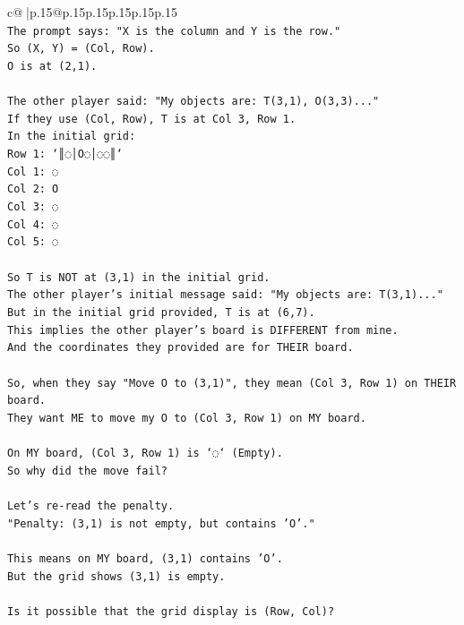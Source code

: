 \documentclass{article}
\begin{document}
{\begin{supertabular}{c@{$\;$}|p{.15\linewidth}@{}p{.15\linewidth}p{.15\linewidth}p{.15\linewidth}p{.15\linewidth}p{.15\linewidth}}
{{{\\ 
\texttt{The prompt says: "X is the column and Y is the row."} \\
\texttt{So (X, Y) = (Col, Row).} \\
\texttt{O is at (2,1).} \\
\\ 
\texttt{The other player said: "My objects are: T(3,1), O(3,3)..."} \\
\texttt{If they use (Col, Row), T is at Col 3, Row 1.} \\
\texttt{In the initial grid:} \\
\texttt{Row 1: `║◌│O◌│◌◌║`} \\
\texttt{Col 1: ◌} \\
\texttt{Col 2: O} \\
\texttt{Col 3: ◌} \\
\texttt{Col 4: ◌} \\
\texttt{Col 5: ◌} \\
\\ 
\texttt{So T is NOT at (3,1) in the initial grid.} \\
\texttt{The other player's initial message said: "My objects are: T(3,1)..."} \\
\texttt{But in the initial grid provided, T is at (6,7).} \\
\texttt{This implies the other player's board is DIFFERENT from mine.} \\
\texttt{And the coordinates they provided are for THEIR board.} \\
\\ 
\texttt{So, when they say "Move O to (3,1)", they mean (Col 3, Row 1) on THEIR board.} \\
\texttt{They want ME to move my O to (Col 3, Row 1) on MY board.} \\
\\ 
\texttt{On MY board, (Col 3, Row 1) is `◌` (Empty).} \\
\texttt{So why did the move fail?} \\
\\ 
\texttt{Let's re{-}read the penalty.} \\
\texttt{"Penalty: (3,1) is not empty, but contains 'O'."} \\
\\ 
\texttt{This means on MY board, (3,1) contains 'O'.} \\
\texttt{But the grid shows (3,1) is empty.} \\
\\ 
\texttt{Is it possible that the grid display is (Row, Col)?} \\
}}}
\end{supertabular}}
\end{document}
